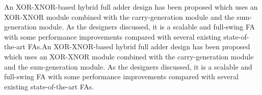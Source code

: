 \documentclass[conference]{IEEEtran}
\begin{document}
An XOR-XNOR-based hybrid full adder design has been proposed\cite{20212210429416}
which uses an XOR-XNOR module combined with the carry-generation module and the sum-generation module.
As the designers discussed, it is a scalable and full-swing FA
with some performance improvements compared with several existing state-of-the-art FAs.An XOR-XNOR-based hybrid full adder design has been proposed\cite{20212210429416}
which uses an XOR-XNOR module combined with the carry-generation module and the sum-generation module.
As the designers discussed, it is a scalable and full-swing FA
with some performance improvements compared with several existing state-of-the-art FAs.



\end{document}
